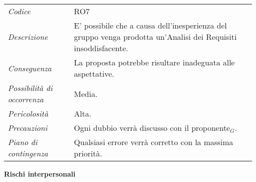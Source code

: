 {{{{{{{{{{\def\tabularxcolumn#1{m{#1}}
{
	
	\begin{center}
		\renewcommand{\arraystretch}{1.4}
		\begin{longtable}{|p{5cm}|p{12cm}|}
			\hline
			\rowcolor{airforceblue}
			\multicolumn{2}{|c|}{\textit{Analisi dei requisiti imperfetta}}\\
			\hline
			\textit{Codice} & RO7 \\
			\hline
			\textit{Descrizione} & E' possibile che a causa dell'inesperienza del gruppo venga prodotta un'Analisi dei Requisiti insoddisfacente.\\
			\hline
			\textit{Conseguenza} & La proposta potrebbe risultare inadeguata alle aspettative. \\
			\hline
			\textit{Possibilità di occorrenza} & Media. \\
			\hline
			\textit{Pericolosità} & Alta. \\
			\hline
			\textit{Precauzioni} & Ogni dubbio verrà discusso con il proponente$_G$.  \\
			\hline
			\textit{Piano di contingenza} & Qualsiasi errore verrà corretto con la massima priorità. \\
			\hline
		\end{longtable}
	\end{center}

\quad
\begin{center}
	\LARGE\textbf{Rischi interpersonali}
\end{center}

\def\tabularxcolumn#1{m{#1}}
{

	\begin{center}
		\renewcommand{\arraystretch}{1.4}


\end{center}}}}}}}}}}}}}
